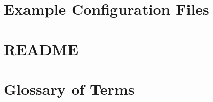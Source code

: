 \documentclass[12pt,a4paper,twoside,openright]{report}
\begin{document}


\newpage

\chapter{Example Configuration Files}



\newpage

\chapter{README}



\newpage

\chapter{Glossary of Terms}



\setcounter{chapter}{1}
\renewcommand{\thechapter}{\arabic{chapter}}

\newpage





\end{document}
